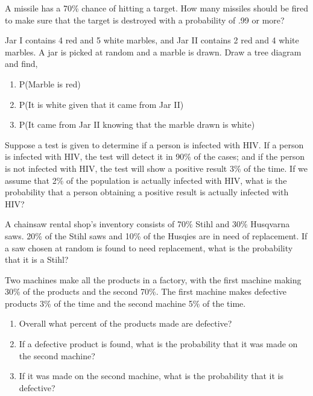 \begin{puzzle}
    A missile has a 70\% chance of hitting a target. How many missiles should be fired to make sure that the target is destroyed with a probability of .99 or more?
\end{puzzle}

\begin{puzzle}
    Jar I contains 4 red and 5 white marbles, and Jar II contains 2 red and 4 white marbles. A jar is picked at random and a marble is drawn. Draw a tree diagram and find,
    \begin{enumerate}
        \item P(Marble is red)
        \item P(It is white given that it came from Jar II)
        \item P(It came from Jar II knowing that the marble drawn is white)
    \end{enumerate}
\end{puzzle}

\begin{puzzle}
    Suppose a test is given to determine if a person is infected with HIV. If a person is infected with HIV, the test will detect it in 90\% of the cases; and if the person is not infected with HIV, the test will show a positive result 3\% of the time. If we assume that 2\% of the population is actually infected with HIV, what is the probability that a person obtaining a positive result is actually infected with HIV?
\end{puzzle}

\begin{puzzle}
    A chainsaw rental shop's inventory consists of 70\% Stihl and 30\% Husqvarna saws. 20\% of the Stihl saws and 10\% of the Husqies are in need of replacement. If a saw chosen at random is found to need replacement, what is the probability that it is a Stihl?
\end{puzzle}

\begin{puzzle}
    Two machines make all the products in a factory, with the first machine making 30\% of the products and the second 70\%. The first machine makes defective products 3\% of the time and the second machine 5\% of the time.
    \begin{enumerate}
        \item Overall what percent of the products made are defective?
        \item If a defective product is found, what is the probability that it was made on the second machine?
        \item If it was made on the second machine, what is the probability that it is defective?
    \end{enumerate}
\end{puzzle}

